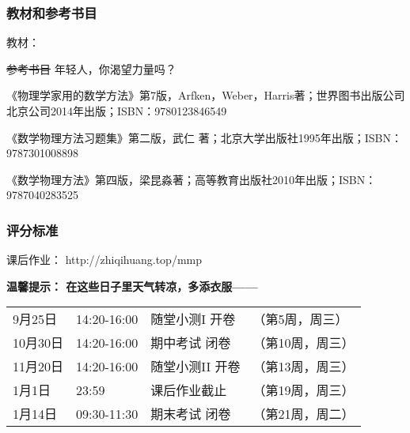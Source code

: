 \documentclass[CJK,13pt]{beamer}
\date{}
\begin{document}
  \bch
{}


\begin{frame}
\frametitle{教材和参考书目}

教材：

\skiplines

\sout{参考书目} 年轻人，你渴望力量吗？
\bitem
\item{《物理学家用的数学方法》第7版，Arfken，Weber，Harris著；世界图书出版公司北京公司2014年出版；ISBN：9780123846549}
\item{《数学物理方法习题集》第二版，武仁 著；北京大学出版社1995年出版；ISBN：9787301008898}
\item{《数学物理方法》第四版，梁昆淼著；高等教育出版社2010年出版；ISBN：9787040283525}
\eitem
      
\end{frame}




\begin{frame}
\frametitle{评分标准}


\skipline

课后作业： http://zhiqihuang.top/mmp

\skipline

{\bf 温馨提示： 在这些日子里天气转凉，多添衣服——}

\skipline

\begin{tabular}{llll}

9月25日 & 14:20-16:00 & 随堂小测I 开卷 & （第5周，周三）\\

10月30日 & 14:20-16:00 & 期中考试 闭卷 & （第10周，周三）\\

11月20日 & 14:20-16:00 & 随堂小测II 开卷 & （第13周，周三） \\

1月1日 &  23:59   &    课后作业截止 & （第19周，周三） \\

1月14日 &  09:30-11:30 & 期末考试 闭卷 & （第21周，周二）

\end{tabular}

\end{frame}
\end{document}

